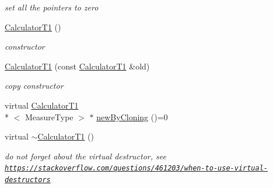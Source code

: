 \begin{DoxyCompactItemize}
\begin{DoxyCompactList}\small\item\em set all the pointers to zero \end{DoxyCompactList}\item 
\hypertarget{class_ox_1_1_calculator_t1_aee286228db734cdd8c6c0686b85fa938}{\hyperlink{class_ox_1_1_calculator_t1_aee286228db734cdd8c6c0686b85fa938}{Calculator\-T1} ()}\label{class_ox_1_1_calculator_t1_aee286228db734cdd8c6c0686b85fa938}

\begin{DoxyCompactList}\small\item\em constructor \end{DoxyCompactList}\item 
\hypertarget{class_ox_1_1_calculator_t1_a125d297d484d10d33b8cbe796b7a60c8}{\hyperlink{class_ox_1_1_calculator_t1_a125d297d484d10d33b8cbe796b7a60c8}{Calculator\-T1} (const \hyperlink{class_ox_1_1_calculator_t1}{Calculator\-T1} \&old)}\label{class_ox_1_1_calculator_t1_a125d297d484d10d33b8cbe796b7a60c8}

\begin{DoxyCompactList}\small\item\em copy constructor \end{DoxyCompactList}\item 
virtual \hyperlink{class_ox_1_1_calculator_t1}{Calculator\-T1}\\*
$<$ Measure\-Type $>$ $\ast$ \hyperlink{class_ox_1_1_calculator_t1_a0db8102b4dad27368667e6ec89c6e4f3}{new\-By\-Cloning} ()=0
\item 
\hypertarget{class_ox_1_1_calculator_t1_af5d360f92d3c1b1c2f4241e528451f2e}{virtual \hyperlink{class_ox_1_1_calculator_t1_af5d360f92d3c1b1c2f4241e528451f2e}{$\sim$\-Calculator\-T1} ()}\label{class_ox_1_1_calculator_t1_af5d360f92d3c1b1c2f4241e528451f2e}

\begin{DoxyCompactList}\small\item\em do not forget about the virtual destructor, see \href{https://stackoverflow.com/questions/461203/when-to-use-virtual-destructors}{\tt https\-://stackoverflow.\-com/questions/461203/when-\/to-\/use-\/virtual-\/destructors} \end{DoxyCompactList}\end{DoxyCompactItemize}

